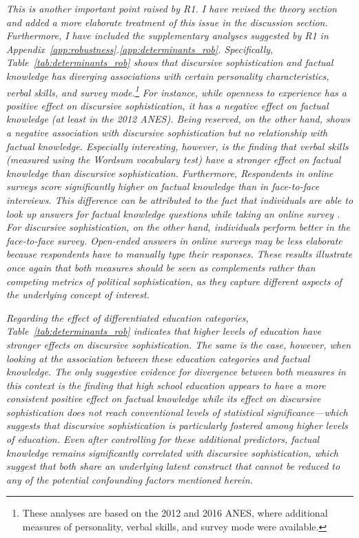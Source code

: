 \textit{This is another important point raised by R1. I have revised the theory section and added a more elaborate treatment of this issue in the discussion section. Furthermore, I have included the supplementary analyses suggested by R1 in Appendix~\ref{app:robustness}.\ref{app:determinants_rob}. Specifically, Table~\ref{tab:determinants_rob} shows that discursive sophistication and factual knowledge has diverging associations with certain personality characteristics, verbal skills, and survey mode.\footnote{These analyses are based on the 2012 and 2016 ANES, where additional measures of personality, verbal skills, and survey mode were available.} For instance, while openness to experience has a positive effect on discursive sophistication, it has a negative effect on factual knowledge (at least in the 2012 ANES). Being reserved, on the other hand, shows a negative association with discursive sophistication but no relationship with factual knowledge. Especially interesting, however, is the finding that verbal skills (measured using the Wordsum vocabulary test) have a stronger effect on factual knowledge than discursive sophistication. Furthermore, Respondents in online surveys score significantly higher on factual knowledge than in face-to-face interviews. This difference can be attributed to the fact that individuals are able to look up answers for factual knowledge questions while taking an online survey \citep{clifford2016cheating}. For discursive sophistication, on the other hand, individuals perform better in the face-to-face survey. Open-ended answers in online surveys may be less elaborate because respondents have to manually type their responses. These results illustrate once again that both measures should be seen as complements rather than competing metrics of political sophistication, as they capture different aspects of the underlying concept of interest.}

\textit{Regarding the effect of differentiated education categories, Table~\ref{tab:determinants_rob} indicates that higher levels of education have stronger effects on discursive sophistication. The same is the case, however, when looking at the association between these education categories and factual knowledge. The only suggestive evidence for divergence between both measures in this context is the finding that high school education appears to have a more consistent positive effect on factual knowledge while its effect on discursive sophistication does not reach conventional levels of statistical significance---which suggests that discursive sophistication is particularly fostered among higher levels of education. Even after controlling for these additional predictors, factual knowledge remains significantly correlated with discursive sophistication, which suggest that both share an underlying latent construct that cannot be reduced to any of the potential confounding factors mentioned herein.}

